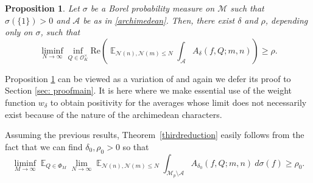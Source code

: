\documentclass[11pt]{amsart}
\newtheorem{proposition}[lemma]{Proposition}
\theoremstyle{definition}
\DeclareMathOperator*{\E}{\mathbb{E}}
\newcommand{\NN}{{\mathcal N}}
\newcommand{\AK}[1]{{\color{ForestGreen}{{#1}}}}
\begin{document}
 \begin{proposition}\label{fffss}
Let $\sigma$ be a Borel probability measure on $\mathcal{M}$ such that $\sigma(\{1\})>0$ and $\mathcal{A}$ be as in \eqref{archimedean}. Then, there exist $\delta$ and $\rho$, depending only on $\sigma$, such that
\begin{equation}
\liminf_{N \to \infty} \inf_{Q \in \mathcal{O}_K^{\times}} \text{Re} \left( \E_{\NN(n),\NN(m) \leq N} \int_{\mathcal{A}} A_{\delta}(f,Q;m,n)\right) \geq \rho.
\end{equation}
\end{proposition}

Proposition \ref{fffss} can be viewed as a variation of 
\cite[Lemma 2.8]{FKM1} and
again we defer its proof  to Section \ref{sec: proofmain}. It is here where we make essential use of the weight function $w_{\delta}$ to obtain positivity for the averages whose limit does not necessarily exist because of the nature of the archimedean characters.

Assuming the previous results, Theorem~\ref{thirdreduction} easily follows from the fact that we can find $\delta_0,\rho_0>0$ so that
\[
\liminf_{M \to \infty}\E_{Q \in \Phi_M} \lim_{N \to \infty} \E_{\NN(n),\NN(m) \leq N} \int_{\mathcal{M}_p \setminus \mathcal{A}} A_{\delta_0}(f,Q; m,n) \ d\sigma(f) \geq \rho_0.%
\]
\end{document}
